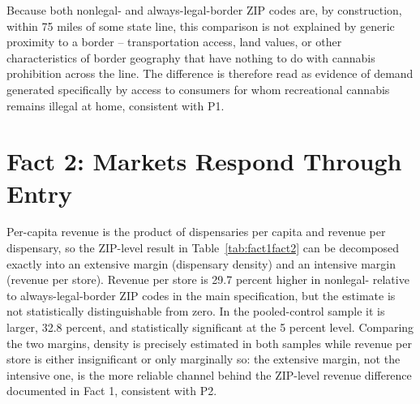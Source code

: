 \documentclass[english,12pt]{article}
\begin{document}
Because both nonlegal- and always-legal-border ZIP codes are, by construction, within 75 miles of some state line, this comparison is not explained by generic proximity to a border -- transportation access, land values, or other characteristics of border geography that have nothing to do with cannabis prohibition across the line. The difference is therefore read as evidence of demand generated specifically by access to consumers for whom recreational cannabis remains illegal at home, consistent with P1.

\begin{table}[htbp]
\centering\scriptsize

\caption{Fact 1 and Fact 2, dynamic specification: quarter-specific nonlegal- vs.\ always-legal-border coefficients $\hat\beta_q$ for revenue per resident, dispensary density, and revenue per store. Sample: full New Mexico ZIP-code panel, 2022Q2--2026Q2 (368 ZIP codes, zero-inclusive; revenue-per-store column restricted to ZIP-quarters with at least one operating dispensary). Each $\hat\beta_q$ is the nonlegal-vs.\ always-legal-border gap in that quarter, not a deviation from an omitted reference quarter. Revenue-per-resident and density columns in inverse-hyperbolic-sine units; revenue-per-store column in logs. All quarters include $\log(\text{population})$ and calendar-quarter fixed effects; standard errors (in parentheses) clustered by county. $^{*}p<.10$ $^{**}p<.05$ $^{***}p<.01$.}
\label{tab:fact1fact2}
\end{table}

\FloatBarrier

\section{Fact 2: Markets Respond Through Entry}
\label{sec:mechanism}

Per-capita revenue is the product of dispensaries per capita and revenue per dispensary, so the ZIP-level result in Table~\ref{tab:fact1fact2} can be decomposed exactly into an extensive margin (dispensary density) and an intensive margin (revenue per store). Revenue per store is 29.7 percent higher in nonlegal- relative to always-legal-border ZIP codes in the main specification, but the estimate is not statistically distinguishable from zero. In the pooled-control sample it is larger, 32.8 percent, and statistically significant at the 5 percent level. Comparing the two margins, density is precisely estimated in both samples while revenue per store is either insignificant or only marginally so: the extensive margin, not the intensive one, is the more reliable channel behind the ZIP-level revenue difference documented in Fact 1, consistent with P2.
\end{document}

